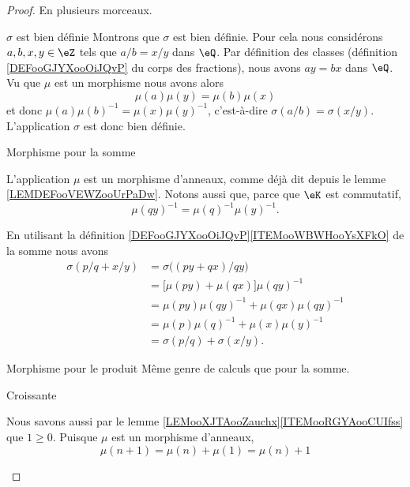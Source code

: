 \begin{proof}
    En plusieurs morceaux.
    \begin{subproof}
    \item[\( \sigma\) est bien définie]
    Montrons que \( \sigma\) est bien définie. Pour cela nous considérons \( a,b,x,y\in \eZ\) tels que \( a/b=x/y\) dans \( \eQ\). Par définition des classes (définition \ref{DEFooGJYXooOiJQvP} du corps des fractions), nous avons \( ay=bx\) dans \( \eQ\). Vu que \( \mu\) est un morphisme nous avons alors
    \begin{equation}
        \mu(a)\mu(y)=\mu(b)\mu(x)
    \end{equation}
    et donc \( \mu(a)\mu(b)^{-1}=\mu(x)\mu(y)^{-1}\), c'est-à-dire \( \sigma(a/b)=\sigma(x/y)\). L'application \( \sigma\) est donc bien définie.

\item[Morphisme pour la somme]

    L'application \( \mu\) est un morphisme d'anneaux, comme déjà dit depuis le lemme \ref{LEMDEFooVEWZooUrPaDw}. Notons aussi que, parce que \( \eK\) est commutatif,
    \begin{equation}
        \mu(qy)^{-1}=\mu(q)^{-1}\mu(y)^{-1}.
    \end{equation}

    En utilisant la définition \ref{DEFooGJYXooOiJQvP}\ref{ITEMooWBWHooYsXFkO} de la somme nous avons
    \begin{subequations}
        \begin{align}
            \sigma(p/q+x/y)&=\sigma\big( (py+qx)/qy \big)\\
            &=\big[ \mu(py)+\mu(qx) \big]\mu(qy)^{-1}\\
            &=\mu(py)\mu(qy)^{-1}+\mu(qx)\mu(qy)^{-1}\\
            &=\mu(p)\mu(q)^{-1}+\mu(x)\mu(y)^{-1}\\
            &=\sigma(p/q)+\sigma(x/y).
        \end{align}
    \end{subequations}

\item[Morphisme pour le produit]
    Même genre de calculs que pour la somme.
\item[Croissante]

    Nous savons aussi par le lemme \ref{LEMooXJTAooZauchx}\ref{ITEMooRGYAooCUIfss} que \( 1\geq 0\). Puisque \( \mu\) est un morphisme d'anneaux,
    \begin{equation}
        \mu(n+1)=\mu(n)+\mu(1)=\mu(n)+1
    \end{equation}


\end{subproof}
\end{proof}
